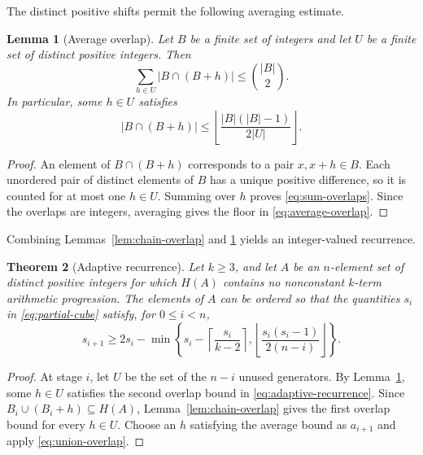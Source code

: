 \documentclass[11pt]{article}
\numberwithin{equation}{section}
\newtheorem{theorem}{Theorem}[section]
\newtheorem{lemma}[theorem]{Lemma}
\theoremstyle{definition}
\theoremstyle{remark}
\newcommand{\ceil}[1]{\left\lceil #1\right\rceil}
\newcommand{\floor}[1]{\left\lfloor #1\right\rfloor}
\begin{document}
\smallskip
\noindent
The distinct positive shifts permit the following averaging estimate.

\begin{lemma}[Average overlap]\label{lem:average-overlap}
Let $B$ be a finite set of integers and let $U$ be a finite set of distinct positive integers. Then
\begin{equation}\label{eq:sum-overlaps}
\sum_{h\in U}|B\cap(B+h)|\le\binom{|B|}{2}.
\end{equation}
In particular, some $h\in U$ satisfies
\begin{equation}\label{eq:average-overlap}
|B\cap(B+h)|
 \le\floor{\frac{|B|(|B|-1)}{2|U|}}.
\end{equation}
\end{lemma}

\begin{proof}
An element of $B\cap(B+h)$ corresponds to a pair $x,x+h\in B$. Each unordered pair of distinct elements of $B$ has a unique positive difference, so it is counted for at most one $h\in U$. Summing over $h$ proves \eqref{eq:sum-overlaps}. Since the overlaps are integers, averaging gives the floor in \eqref{eq:average-overlap}.
\end{proof}

\smallskip
\noindent
Combining Lemmas~\ref{lem:chain-overlap} and \ref{lem:average-overlap} yields an integer-valued recurrence.

\begin{theorem}[Adaptive recurrence]\label{thm:adaptive-recurrence}
Let $k\ge3$, and let $A$ be an $n$-element set of distinct positive integers for which $H(A)$ contains no nonconstant $k$-term arithmetic progression. The elements of $A$ can be ordered so that the quantities $s_i$ in \eqref{eq:partial-cube} satisfy, for $0\le i<n$,
\begin{equation}\label{eq:adaptive-recurrence}
s_{i+1}\ge
2s_i-
\min\left\{
 s_i-\ceil{\frac{s_i}{k-2}},
 \floor{\frac{s_i(s_i-1)}{2(n-i)}}
\right\}.
\end{equation}
\end{theorem}

\begin{proof}
At stage $i$, let $U$ be the set of the $n-i$ unused generators. By Lemma~\ref{lem:average-overlap}, some $h\in U$ satisfies the second overlap bound in \eqref{eq:adaptive-recurrence}. Since $B_i\cup(B_i+h)\subseteq H(A)$, Lemma~\ref{lem:chain-overlap} gives the first overlap bound for every $h\in U$. Choose an $h$ satisfying the average bound as $a_{i+1}$ and apply \eqref{eq:union-overlap}.
\end{proof}
\end{document}
